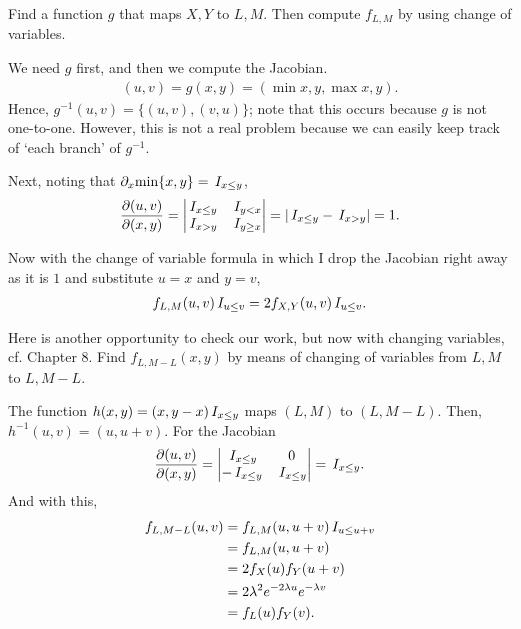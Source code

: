 \documentclass[a4paper,11pt]{article}
\begin{document}
\begin{exercise}
Find a function $g$ that maps $X,Y$ to $L,M$. Then compute $f_{L,M}$ by using change of variables. 
\begin{solution}
We need $g$ first, and then we compute the Jacobian. 
\begin{align}
(u,v) = g(x, y) = (\min{x,y}, \max{x,y}).
\end{align}
Hence, $g^{-1}(u,v) = \{(u,v), (v, u)\}$; note that this occurs because $g$ is not one-to-one.
However, this is not a real problem because we can easily keep track of `each branch' of $g^{-1}$. 

Next, noting that $\partial_{x}\mathrm{min}\{x,y\} = \,I_{x\leq y}$, 
\begin{align}
\frac{\partial (u,v)}{\partial(x,y)} = 
  \begin{vmatrix}
    \,I_{x\leq y} & \,I_{y<x} \\
    \,I_{x > y} & \,I_{y \geq x} \\
  \end{vmatrix} = |\,I_{x\leq y} - \,I_{x>y}| = 1.
\end{align}

Now with the change of variable formula in which I drop the Jacobian right away as it is $1$ and substitute $u=x$ and $y=v$,
\begin{align}
  \label{eq:30}
f_{L,M}(u,v)\,I_{u\leq v} = 2f_{X,Y}(u,v)\,I_{u\leq v}.
\end{align}
\end{solution}
\end{exercise}



\begin{exercise}
Here is another opportunity to check our work, but now with changing variables, cf. Chapter 8.
Find $f_{L,M-L}(x,y)$ by means of changing of variables from $L,M$ to $L,M-L$.
\begin{solution}
  The function $h(x,y)= (x, y-x)\,I_{x\leq y}$ maps $(L,M)$ to $(L, M-L)$. Then, $h^{-1}(u,v) = (u, u+v)$. For the Jacobian
  \begin{align}
    \label{eq:57}
\frac{\partial (u,v)}{\partial(x,y)} = 
    \begin{vmatrix}
      \,I_{x\leq y} & 0 \\
-\,I_{x\leq y} & \,I_{x\leq y}
    \end{vmatrix} = \,I_{x\leq y}.
  \end{align}
And with this,
\begin{align}
  \label{eq:19}
f_{L, M-L}(u,v) 
&= f_{L, M}(u, u+v) \,I_{u\leq u+v}  \\
&= f_{L,M}(u, u+v) \\
&= 2 f_{X}(u) f_Y(u+v) \\
&= 2 \lambda^{2}e^{-2\lambda u} e^{-\lambda v} \\
&= f_{L}(u) f_Y(v).
\end{align}

\end{solution}
\end{exercise}
\end{document}
